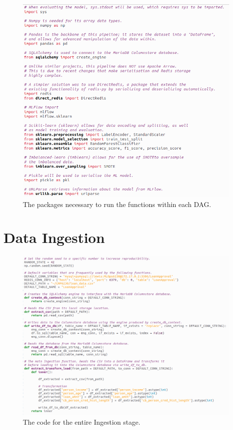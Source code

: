 \documentclass[12pt]{report}
\begin{document}
\begin{figure}[H]
    \centering
    \includegraphics[width=\linewidth]{Implementation/.Code/PipelineFunctionsImport.png}
    \caption{The packages necessary to run the functions within each DAG.}
    \label{fig:PipelineFunctionsImports}
\end{figure}

\section{Data Ingestion}\label{sec:ImpIngestion}

\begin{figure}[H]
    \centering
    \includegraphics[width=\linewidth]{Implementation/.Code/PipelineFunctions/Ingestion.png}
    \caption{The code for the entire Ingestion stage.}
    \label{fig:IngestionCode}
\end{figure}
\end{document}
